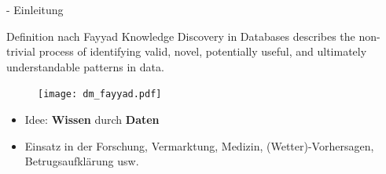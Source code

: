 \documentclass[fleqn,11pt,aspectratio=43]{beamer}
\begin{document}
\begin{frame}{\insertsectionhead - Einleitung \cite{ester2000knowledge}}
\small

\vspace{-0.8em}
\begin{block}{Definition nach Fayyad \cite{fayyad1996data}}
Knowledge Discovery in Databases describes the non-trivial process of 
identifying valid, novel, potentially useful, and ultimately understandable 
patterns in data.
\begin{figure}
\vspace{-2.7em} \hspace{-1.5em}
\texttt{[image: dm\_fayyad.pdf]}
\label{fig:fayyad1996data}
\end{figure}
\vspace{-3.5em}
\end{block}
\vspace{-1em}
\begin{itemize} %
\setlength{\itemsep}{-3pt}
\item Idee: \textbf{Wissen} durch \textbf{Daten}
\item Einsatz in der Forschung, Vermarktung, Medizin, (Wetter)-Vorhersagen, 
Betrugsaufklärung usw.
\end{itemize}
\end{frame}

%

%
\end{document}
